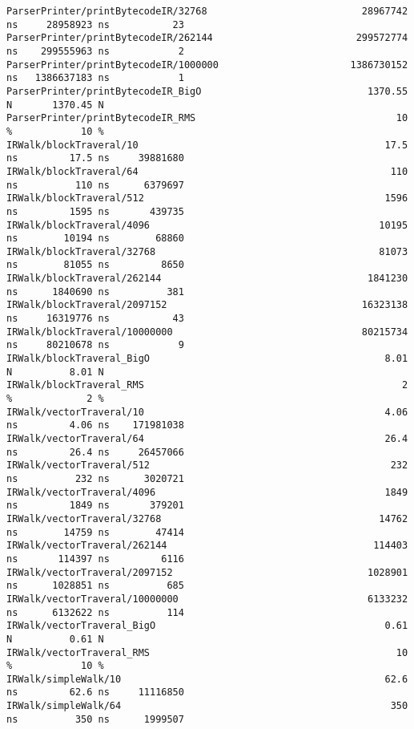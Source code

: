 \begin{code}
\begin{verbatim}
ParserPrinter/printBytecodeIR/32768                           28967742 ns     28958923 ns           23
ParserPrinter/printBytecodeIR/262144                         299572774 ns    299555963 ns            2
ParserPrinter/printBytecodeIR/1000000                       1386730152 ns   1386637183 ns            1
ParserPrinter/printBytecodeIR_BigO                             1370.55 N       1370.45 N
ParserPrinter/printBytecodeIR_RMS                                   10 %            10 %
IRWalk/blockTraveral/10                                           17.5 ns         17.5 ns     39881680
IRWalk/blockTraveral/64                                            110 ns          110 ns      6379697
IRWalk/blockTraveral/512                                          1596 ns         1595 ns       439735
IRWalk/blockTraveral/4096                                        10195 ns        10194 ns        68860
IRWalk/blockTraveral/32768                                       81073 ns        81055 ns         8650
IRWalk/blockTraveral/262144                                    1841230 ns      1840690 ns          381
IRWalk/blockTraveral/2097152                                  16323138 ns     16319776 ns           43
IRWalk/blockTraveral/10000000                                 80215734 ns     80210678 ns            9
IRWalk/blockTraveral_BigO                                         8.01 N          8.01 N
IRWalk/blockTraveral_RMS                                             2 %             2 %
IRWalk/vectorTraveral/10                                          4.06 ns         4.06 ns    171981038
IRWalk/vectorTraveral/64                                          26.4 ns         26.4 ns     26457066
IRWalk/vectorTraveral/512                                          232 ns          232 ns      3020721
IRWalk/vectorTraveral/4096                                        1849 ns         1849 ns       379201
IRWalk/vectorTraveral/32768                                      14762 ns        14759 ns        47414
IRWalk/vectorTraveral/262144                                    114403 ns       114397 ns         6116
IRWalk/vectorTraveral/2097152                                  1028901 ns      1028851 ns          685
IRWalk/vectorTraveral/10000000                                 6133232 ns      6132622 ns          114
IRWalk/vectorTraveral_BigO                                        0.61 N          0.61 N
IRWalk/vectorTraveral_RMS                                           10 %            10 %
IRWalk/simpleWalk/10                                              62.6 ns         62.6 ns     11116850
IRWalk/simpleWalk/64                                               350 ns          350 ns      1999507

\end{verbatim}
\end{code}

